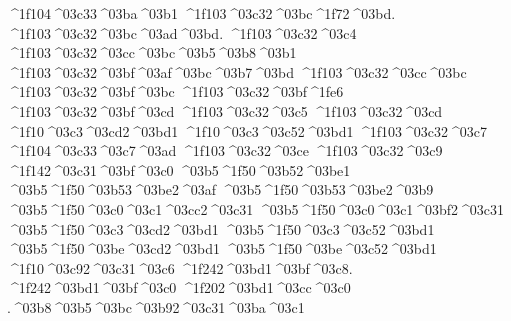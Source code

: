 {		^^^^1f104^^^^03c33^^^^03ba^^^^03b1  		%
%
	^^^^1f103^^^^03c32^^^^03bc^^^^1f72^^^^03bd.  ^^^^1f103^^^^03c32^^^^03bc^^^^03ad^^^^03bd.	%
	^^^^1f103^^^^03c32^^^^03c4
	^^^^1f103^^^^03c32^^^^03cc^^^^03bc^^^^03b5^^^^03b8^^^^03b1
	^^^^1f103^^^^03c32^^^^03bf^^^^03af^^^^03bc^^^^03b7^^^^03bd
	^^^^1f103^^^^03c32^^^^03cc^^^^03bc		%
	^^^^1f103^^^^03c32^^^^03bf^^^^03bc
	^^^^1f103^^^^03c32^^^^03bf^^^^1fe6 		%
	^^^^1f103^^^^03c32^^^^03bf^^^^03cd
%
	^^^^1f103^^^^03c32^^^^03c5  		%
	^^^^1f103^^^^03c32^^^^03cd
	^^^^1f10^^^^03c3^^^^03cd2^^^^03bd1 		%
	^^^^1f10^^^^03c3^^^^03c52^^^^03bd1
	^^^^1f103^^^^03c32^^^^03c7
		^^^^1f104^^^^03c33^^^^03c7^^^^03ad		%
	^^^^1f103^^^^03c32^^^^03ce
	^^^^1f103^^^^03c32^^^^03c9
^^^^1f142^^^^03c31^^^^03bf^^^^03c0 		%
^^^^03b5^^^^1f50^^^^03b52^^^^03be1  		%
	^^^^03b5^^^^1f50^^^^03b53^^^^03be2^^^^03af 		%
	^^^^03b5^^^^1f50^^^^03b53^^^^03be2^^^^03b9
^^^^03b5^^^^1f50^^^^03c0^^^^03c1^^^^03cc2^^^^03c31 		%
^^^^03b5^^^^1f50^^^^03c0^^^^03c1^^^^03bf2^^^^03c31
^^^^03b5^^^^1f50^^^^03c3^^^^03cd2^^^^03bd1 		%
^^^^03b5^^^^1f50^^^^03c3^^^^03c52^^^^03bd1
^^^^03b5^^^^1f50^^^^03be^^^^03cd2^^^^03bd1 		%
^^^^03b5^^^^1f50^^^^03be^^^^03c52^^^^03bd1
^^^^1f10^^^^03c92^^^^03c31^^^^03c6   		%
^^^^1f242^^^^03bd1^^^^03bf^^^^03c8.		%
^^^^1f242^^^^03bd1^^^^03bf^^^^03c0
^^^^1f202^^^^03bd1^^^^03cc^^^^03c0
.^^^^03b8^^^^03b5^^^^03bc^^^^03b92^^^^03c31^^^^03ba^^^^03c1  %
}
